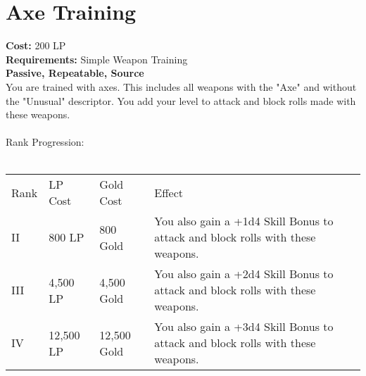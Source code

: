 \section{Axe Training}\label{perk:axeTraining}
\textbf{Cost:} 200 LP\\
\textbf{Requirements:} Simple Weapon Training\\
\textbf{Passive, Repeatable, Source}\\
You are trained with axes.
This includes all weapons with the "Axe" and without the "Unusual" descriptor.
You add your level to attack and block rolls made with these weapons.\\
\\
Rank Progression:\\
\\
\begin{longtable}{l | l | l | p{9cm}}
	Rank & LP Cost & Gold Cost & Effect\\
	II & 800 LP & 800 Gold & You also gain a +1d4 Skill Bonus to attack and block rolls with these weapons.\\
	III & 4,500 LP & 4,500 Gold & You also gain a +2d4 Skill Bonus to attack and block rolls with these weapons.\\
	IV & 12,500 LP & 12,500 Gold & You also gain a +3d4 Skill Bonus to attack and block rolls with these weapons.\\
\end{longtable}